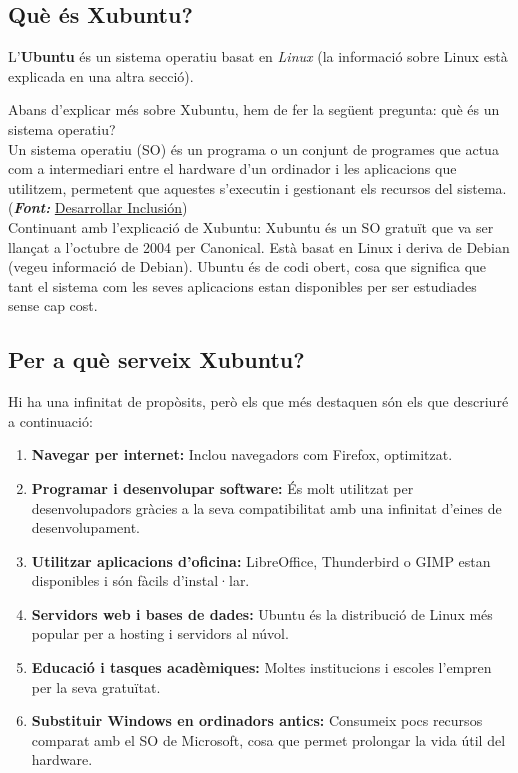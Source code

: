 \subsection{Què és Xubuntu?}
L’\textbf{Ubuntu} és un sistema operatiu basat en \textit{Linux} (la informació sobre Linux està explicada en una altra secció).

Abans d’explicar més sobre Xubuntu, hem de fer la següent pregunta: què és un sistema operatiu? \\

Un sistema operatiu (SO) és un programa o un conjunt de programes que actua com a intermediari entre el hardware d’un ordinador i les aplicacions que utilitzem, permetent que aquestes s’executin i gestionant els recursos del sistema. (\textit{\textbf{Font:}} \href{https://desarrollarinclusion.cilsa.org/tecnologia-inclusiva/que-es-un-sistema-operativo/#:~:text=Un\%20sistema\%20operativo\%20es\%20un,placa\%20de\%20red\%2C\%20entre\%20otros.}{Desarrollar Inclusión}) \\

Continuant amb l’explicació de Xubuntu: Xubuntu és un SO gratuït que va ser llançat a l’octubre de 2004 per Canonical. Està basat en Linux i deriva de Debian (vegeu informació de Debian). Ubuntu és de codi obert, cosa que significa que tant el sistema com les seves aplicacions estan disponibles per ser estudiades sense cap cost.

\subsection{Per a què serveix Xubuntu?}
Hi ha una infinitat de propòsits, però els que més destaquen són els que descriuré a continuació:
\begin{enumerate}
 \item \textbf{Navegar per internet:} Inclou navegadors com Firefox, optimitzat.
 \item \textbf{Programar i desenvolupar software:} És molt utilitzat per desenvolupadors gràcies a la seva compatibilitat amb una infinitat d’eines de desenvolupament.
 \item \textbf{Utilitzar aplicacions d’oficina:} LibreOffice, Thunderbird o GIMP estan disponibles i són fàcils d’instal·lar.
 \item \textbf{Servidors web i bases de dades:} Ubuntu és la distribució de Linux més popular per a hosting i servidors al núvol.
 \item \textbf{Educació i tasques acadèmiques:} Moltes institucions i escoles l’empren per la seva gratuïtat.
 \item \textbf{Substituir Windows en ordinadors antics:} Consumeix pocs recursos comparat amb el SO de Microsoft, cosa que permet prolongar la vida útil del hardware.
\end{enumerate}

